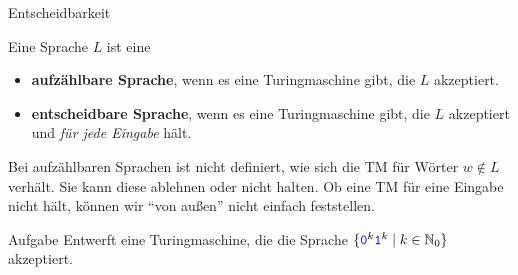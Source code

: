 \begin{frame}{Entscheidbarkeit}
	\begin{Definition}
		Eine Sprache $L$ ist eine   
		\begin{itemize}[<+->]
			\item \textbf{aufzählbare Sprache}, wenn es eine Turingmaschine gibt, die $L$ akzeptiert.
			\item \textbf{entscheidbare Sprache}, wenn es eine Turingmaschine gibt, die $L$ akzeptiert und \emph{für jede Eingabe} hält.
		\end{itemize}
	\end{Definition} \pause
	
	Bei aufzählbaren Sprachen ist nicht definiert, wie sich die TM für Wörter $ w \notin L$ verhält. Sie kann diese ablehnen oder nicht halten. Ob eine TM für eine Eingabe nicht hält, können wir \enquote{von außen} nicht einfach feststellen.
\end{frame}


\begin{frame}{Aufgabe}
	Entwerft eine Turingmaschine, die die Sprache $ \{\hbox{\textcolor{blue}{\texttt{0}}}^k\hbox{\textcolor{blue}{\texttt{1}}}^k \mid k\in \mathbb{N}_0 \} $ akzeptiert.
    \pause
	\begin{center}
    \end{center}
\end{frame}

